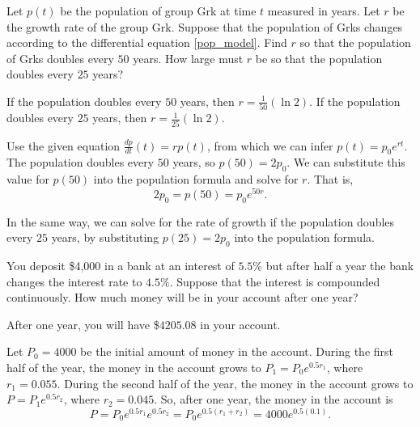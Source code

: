 \documentclass{ximera}
\begin{document}
\begin{exercise} \label{c3.1.6}
Let $p(t)$ be the population of group Grk at time $t$ measured in years.
Let $r$ be the growth rate of the group Grk.  Suppose that the population
of Grks changes according to the differential equation \eqref{pop_model}.
Find $r$ so that the population of Grks doubles every $50$ years.  How
large must $r$ be so that the population doubles every $25$ years?

\begin{solution}

\ans If the population doubles every $50$ years, then
$r = \frac{1}{50}(\ln 2)$.  If the population doubles every $25$
years, then $r = \frac{1}{25}(\ln 2)$.

\soln Use the given equation $\frac{dp}{dt}(t) = rp(t)$,
from which we can infer $p(t) = p_0e^{rt}$.
The population doubles every $50$ years, so $p(50) = 2p_0$.  We
can substitute this value for $p(50)$ into the population formula
and solve for $r$.  That is,
\[
2p_0 = p(50) = p_0e^{50r}.
\]

In the same way, we can solve for the rate of growth if the population
doubles every $25$ years, by substituting $p(25) = 2p_0$ into the
population formula.

\end{solution}
\end{exercise}

\begin{exercise} \label{c3.1.7A}
You deposit \$4,000 in a bank at an interest of $5.5\%$ but after half 
a year the bank changes the interest rate to $4.5\%$.  Suppose that the 
interest is compounded continuously.  How much money will be in your 
account after one year?

\begin{solution}
\ans After one year, you will have \$$4205.08$ in your account.

\soln Let $P_0 = 4000$ be the initial amount of money in the account. 
During the first half of the year, the money in the account grows to $P_1 =
P_0e^{0.5r_1}$, where $r_1 = 0.055$.  During the second half of the year,
the money in the account grows to $P = P_1e^{0.5r_2}$, where $r_2 = 0.045$.
So, after one year, the money in the account is
\[
P = P_0e^{0.5r_1}e^{0.5r_2} = P_0e^{0.5(r_1 + r_2)} = 4000e^{0.5(0.1)}.
\]

\end{solution}
\end{exercise}
\end{document}
